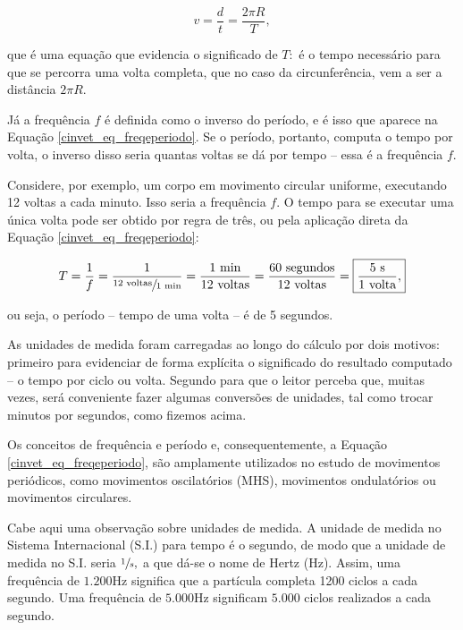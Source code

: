 $$ v = \dfrac{d}{t} = \dfrac{2 \pi R}{T},$$

\noindent que é uma equação que evidencia o significado de $T:$ é o tempo necessário para que se percorra uma volta completa, que no caso da circunferência, vem a ser a distância $2 \pi R.$

Já a frequência $f$ é definida como o inverso do período, e é isso que aparece na Equação \eqref{cinvet_eq_freqeperiodo}. Se o período, portanto, computa o tempo por volta, o inverso disso seria quantas voltas se dá por tempo -- essa é a frequência $f$.

Considere, por exemplo, um corpo em movimento circular uniforme, executando 12 voltas a cada minuto. Isso seria a frequência $f$. O tempo para se executar uma única volta pode ser obtido por regra de três, ou pela aplicação direta da Equação \eqref{cinvet_eq_freqeperiodo}:

$$ T = \dfrac{1}{f}=\dfrac{1}{\sfrac{12 \text{ voltas}}{1 \text{ min}}} = \dfrac{1 \text{ min}}{12 \text{ voltas}} = \dfrac{60 \text{ segundos}}{12 \text{ voltas}} = \boxed{ \dfrac{5 \text{ s}}{1\text{ volta}},}$$

\noindent ou seja, o período -- tempo de uma volta -- é de 5 segundos.

As unidades de medida foram carregadas ao longo do cálculo por dois motivos: primeiro para evidenciar de forma explícita o significado do resultado computado -- o tempo por ciclo ou volta. Segundo para que o leitor perceba que, muitas vezes, será conveniente fazer algumas conversões de unidades, tal como trocar minutos por segundos, como fizemos acima.


Os conceitos de frequência e período e, consequentemente, a Equação \eqref{cinvet_eq_freqeperiodo}, são amplamente utilizados no estudo de movimentos periódicos, como movimentos oscilatórios (MHS), movimentos ondulatórios ou movimentos circulares.








Cabe aqui uma observação sobre unidades de medida. A unidade de medida no Sistema Internacional (S.I.) para tempo é o segundo, de modo que a unidade de medida no S.I. seria $\sfrac{1}{s},$ a que dá-se o nome de Hertz (Hz). Assim, uma frequência de $1.200$Hz significa que a partícula completa 1200 ciclos a cada segundo. Uma frequência de $5.000$Hz significam $5.000$ ciclos realizados a cada segundo.

